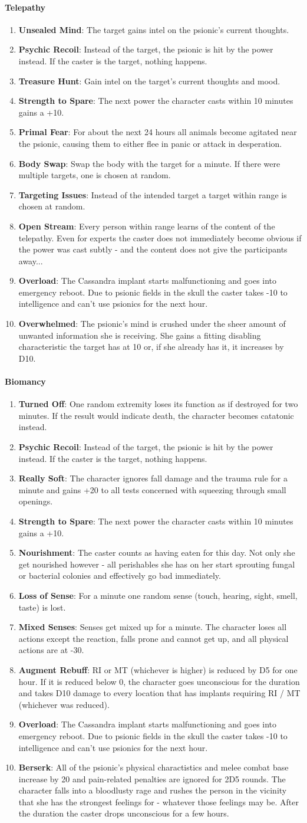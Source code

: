 \documentclass[12pt,a4paper,openany]{book}
\newcommand{\mod}[2]{\item \textbf{#1}: #2}
\newcommand{\dpeii}{\mod{Psychic Recoil}{Instead of the target, the psionic is hit by the power instead. If the caster is the target, nothing happens.}}
\newcommand{\dpeiv}{\mod{Strength to Spare}{The next power the character casts within 10 minutes gains a +10.}}
\newcommand{\dpeix}{\mod{Overload}{The Cassandra implant starts malfunctioning and goes into emergency reboot. Due to psionic fields in the skull the caster takes -10 to intelligence and can't use psionics for the next hour.}\setcounter{enumi}{-1}}
\begin{document}
	\paragraph{Telepathy}
	\begin{enumerate}
		\mod{Unsealed Mind}{The target gains intel on the psionic's current thoughts.}
		\dpeii
		\mod{Treasure Hunt}{Gain intel on the target's current thoughts and mood.}
		\dpeiv
		\mod{Primal Fear}{For about the next 24 hours all animals become agitated near the psionic, causing them to either flee in panic or attack in desperation.}
		\mod{Body Swap}{Swap the body with the target for a minute. If there were multiple targets, one is chosen at random.}
		\mod{Targeting Issues}{Instead of the intended target a target within range is chosen at random.}
		\mod{Open Stream}{Every person within range learns of the content of the telepathy. Even for experts the caster does not immediately become obvious if the power was cast subtly - and the content does not give the participants away...}
		\dpeix
		\mod{Overwhelmed}{The psionic's mind is crushed under the sheer amount of unwanted information she is receiving. She gains a fitting disabling characteristic the target has at 10 or, if she already has it, it increases by D10.}
	\end{enumerate}
	\paragraph{Biomancy}
	\begin{enumerate}
		\mod{Turned Off}{One random extremity loses its function as if destroyed for two minutes. If the result would indicate death, the character becomes catatonic instead.}
		\dpeii
		\mod{Really Soft}{The character ignores fall damage and the trauma rule for a minute and gains +20 to all tests concerned with squeezing through small openings.}
		\dpeiv
		\mod{Nourishment}{The caster counts as having eaten for this day. Not only she get nourished however - all perishables she has on her start sprouting fungal or bacterial colonies and effectively go bad immediately.}
		\mod{Loss of Sense}{For a minute one random sense (touch, hearing, sight, smell, taste) is lost.}
		\mod{Mixed Senses}{Senses get mixed up for a minute. The character loses all actions except the reaction, falls prone and cannot get up, and all physical actions are at -30.}
		\mod{Augment Rebuff}{RI or MT (whichever is higher) is reduced by D5 for one hour. If it is reduced below 0, the character goes unconscious for the duration and takes D10 damage to every location that has implants requiring RI / MT (whichever was reduced).}
		\dpeix
		\mod{Berserk}{All of the psionic's physical charactistics and melee combat base increase by 20 and pain-related penalties are ignored for 2D5 rounds. The character falls into a bloodlusty rage and rushes the person in the vicinity that she has the strongest feelings for - whatever those feelings may be. After the duration the caster drops unconscious for a few hours.}
	\end{enumerate}
\end{document}
